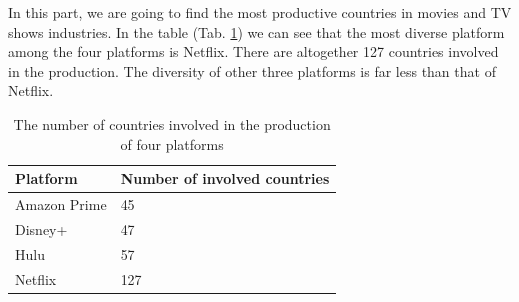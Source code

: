 \documentclass{article}
\begin{document}
In this part, we are going to find the most productive countries in movies and TV 
shows industries. In the table (Tab. \ref{tab:diversity_production}) we can see 
that the most diverse platform among the four platforms is Netflix. There are 
altogether 127 countries involved in the production. The diversity of other three 
platforms is far less than that of Netflix.

\begin{table}[!htb]
	\centering
	\caption{The number of countries involved in the production of four platforms}
	\label{tab:diversity_production}
	\begin{tabular}{@{}ll@{}}
	\toprule
	Platform     & Number of involved countries \\ \midrule
	Amazon Prime & 45                           \\
	Disney+      & 47                           \\
	Hulu         & 57                           \\
	Netflix      & 127                          \\ \bottomrule
	\end{tabular}
\end{table}
\end{document}
